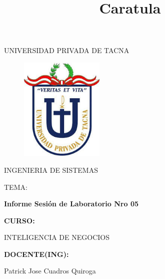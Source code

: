 \documentclass[preprint,12pt]{elsarticle}
\begin{document}
\title{Caratula}

\begin{titlepage}
\begin{center}
\large{UNIVERSIDAD PRIVADA DE TACNA}\\
\vspace*{-0.025in}
\begin{figure}[htb]
\begin{center}
\includegraphics[width=4cm]{./IMAGENES/logo.jpg}
\end{center}
\end{figure}
\vspace*{0.15in}
INGENIERIA DE SISTEMAS  \\

\vspace*{0.5in}
\begin{large}
TEMA:\\
\end{large}

\vspace*{0.1in}
\begin{Large}
\textbf{Informe Sesión de Laboratorio Nro 05} \\
\end{Large}

\vspace*{0.3in}
\begin{Large}
\textbf{CURSO:} \\
\end{Large}

\vspace*{0.1in}
\begin{large}
INTELIGENCIA DE NEGOCIOS\\
\end{large}

\vspace*{0.3in}
\begin{Large}
\textbf{DOCENTE(ING):} \\
\end{Large}

\vspace*{0.1in}
\begin{large}
 Patrick Jose Cuadros Quiroga\\
\end{large}


\end{center}
\end{titlepage}
\end{document}
